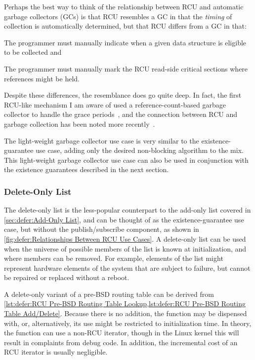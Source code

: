 Perhaps the best way to think of the relationship between RCU
and automatic garbage collectors (GCs) is that RCU resembles
a GC in that the \emph{timing} of collection is automatically
determined, but that RCU differs from a GC in that:
\begin{enumerate*}[(1)]
\item The programmer must manually indicate when a given data
structure is eligible to be collected and
\item The programmer must manually mark the RCU read-side critical
sections where references might be held.
\end{enumerate*}

Despite these differences, the resemblance does go quite deep.
In fact, the first RCU-like mechanism I am aware of used a
reference-count-based garbage collector to handle the grace
periods~\cite{Kung80}, and the connection between RCU and
garbage collection has been noted more
recently~\cite{HarshalSheth2016goRCU}.

The light-weight garbage collector use case is very similar to
the existence-guarantee use case, adding only the desired non-blocking
algorithm to the mix.
This light-weight garbage collector use case can also be used in
conjunction with the existence guarantees described in the next section.

\subsubsection{Delete-Only List}
\label{sec:defer:Delete-Only List}

The delete-only list is the less-popular counterpart to the add-only list
covered in \cref{sec:defer:Add-Only List}, and can be thought of as the
existence-guarantee use case, but without the publish/subscribe component,
as shown in \cref{fig:defer:Relationships Between RCU Use Cases}.
A delete-only list can be used when the universe of possible members of
the list is known at initialization, and where members can be removed.
For example, elements of the list might represent hardware elements of
the system that are subject to failure, but cannot be repaired or
replaced without a reboot.

A delete-only variant of a pre-BSD routing table can be derived from
\cref{lst:defer:RCU Pre-BSD Routing Table Lookup,lst:defer:RCU Pre-BSD Routing Table Add/Delete}.
Because there is no addition, the  function may be
dispensed with, or, alternatively, its use might be restricted to
initialization time.
In theory, the  function can use a non-RCU iterator,
though in the Linux kernel this will result in complaints from debug code.
In addition, the incremental cost of an RCU iterator is usually
negligible.

